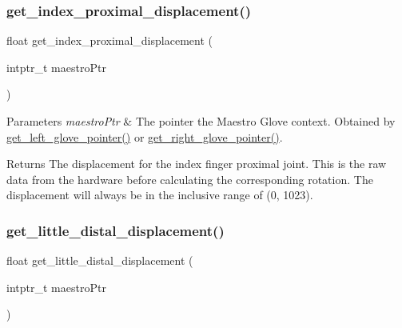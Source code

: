 \subsubsection{\texorpdfstring{get\+\_\+index\+\_\+proximal\+\_\+displacement()}{get\_index\_proximal\_displacement()}}
{\footnotesize\ttfamily float get\+\_\+index\+\_\+proximal\+\_\+displacement (\begin{DoxyParamCaption}\item[{intptr\+\_\+t}]{maestro\+Ptr }\end{DoxyParamCaption})}


\begin{DoxyParams}{Parameters}
{\em maestro\+Ptr} & The pointer the Maestro Glove context. Obtained by \hyperlink{group__glove_management_ga63ce3c99d4a8b8db851b22af9185764e}{get\+\_\+left\+\_\+glove\+\_\+pointer()} or \hyperlink{group__glove_management_ga9b8fd9d91aeac3f8da50f7a7eba0c32b}{get\+\_\+right\+\_\+glove\+\_\+pointer()}. \\
\hline
\end{DoxyParams}
\begin{DoxyReturn}{Returns}
The displacement for the index finger proximal joint. This is the raw data from the hardware before calculating the corresponding rotation. The displacement will always be in the inclusive range of (0, 1023). 
\end{DoxyReturn}
\mbox{\label{group__displacement_access_ga4c8a12c14e6b292b513ac52fd0ab21cb}} 
\subsubsection{\texorpdfstring{get\+\_\+little\+\_\+distal\+\_\+displacement()}{get\_little\_distal\_displacement()}}
{\footnotesize\ttfamily float get\+\_\+little\+\_\+distal\+\_\+displacement (\begin{DoxyParamCaption}\item[{intptr\+\_\+t}]{maestro\+Ptr }\end{DoxyParamCaption})}


